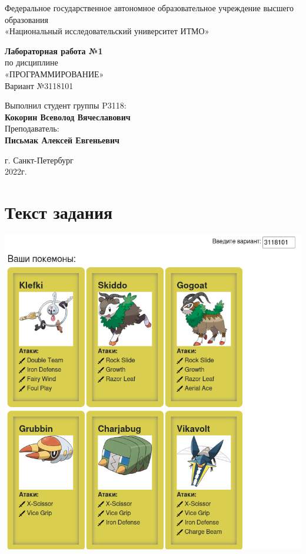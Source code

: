 \documentclass[12pt,onecolumn]{article}
\begin{document}
\begin{center}
    Федеральное государственное автономное образовательное учреждение высшего образования\\
	«Национальный исследовательский университет ИТМО»
\end{center}
\vspace{1cm}


\begin{center}
    \large \textbf{Лабораторная работа №1}\\
    по дисциплине\\
    «ПРОГРАММИРОВАНИЕ»\\
	\vspace{1cm}
    Вариант №3118101\\
\end{center}

\vspace{10cm}
\begin{flushright}
  Выполнил студент  группы P3118: \\
  \textbf{Кокорин Всеволод Вячеславович}\\
  Преподаватель: \\
  \textbf{Письмак Алексей Евгеньевич}\\
\end{flushright}

\vspace{5cm}
\begin{center}
    г. Санкт-Петербург\\
    2022г.
\end{center}
\newpage
\tableofcontents
\newpage
\section{Текст задания}
\includegraphics[width=\columnwidth]{img/task.png}
\end{document}
